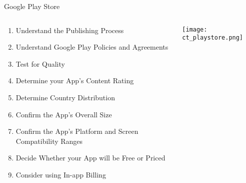 
\begin{frame}{Google Play Store}

  \begin{columns}[T] %
     \begin{column}[T]{0.55\textwidth} %


     \begin{enumerate}

\item Understand the Publishing Process
\item Understand Google Play Policies and Agreements
\item Test for Quality
\item Determine your App’s Content Rating
\item Determine Country Distribution
\item Confirm the App's Overall Size
\item Confirm the App's Platform and Screen Compatibility Ranges
\item Decide Whether your App will be Free or Priced
\item Consider using In-app Billing

     \end{enumerate}


     \end{column}
     \begin{column}[T]{0.45\textwidth} %

\texttt{[image: ct\_playstore.png]}

     \end{column}
     \end{columns}

\end{frame}

